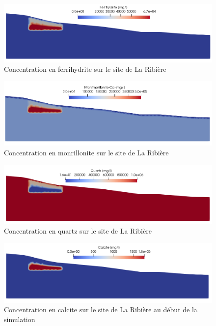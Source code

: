\documentclass{article}
\begin{document}
\begin{figure}[H]
    \centering
    \includegraphics[width=\linewidth]{LJ-Ferrihydrite-concentration.PNG}
    \caption{Concentration en ferrihydrite sur le site de La Ribière}
    \label{fig:concentration_ferrihydrite}
\end{figure}

\begin{figure}[H]
    \centering
    \includegraphics[width=\linewidth]{LJ-Montmorillonite-concentration.PNG}
    \caption{Concentration en monrillonite sur le site de La Ribière}
    \label{fig:concentration_montmorillonite}
\end{figure}

\begin{figure}[H]
    \centering
    \includegraphics[width=\linewidth]{LJ-Quartz-concentration.PNG}
    \caption{Concentration en quartz sur le site de La Ribière}
    \label{fig:concentration_quartz}
\end{figure}
\begin{figure}[H]
    \centering
    \includegraphics[width=\linewidth]{LJ-Calcite-initial-concentration.PNG}
    \caption{Concentration en calcite sur le site de La Ribière au début de la simulation}
    \label{fig:concentration_calcite_initial}
\end{figure}
\end{document}

